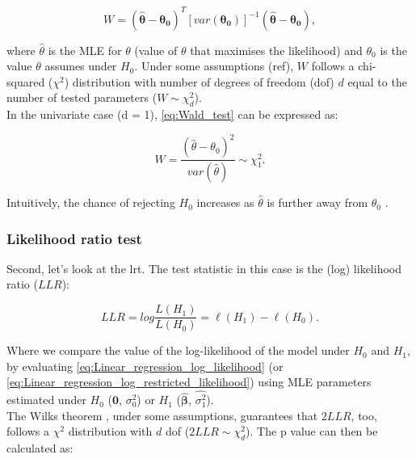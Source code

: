 \begin{equation}\label{eq:Wald_test}
W = (\hat{\boldsymbol{\theta}}-\boldsymbol{\theta_0})^T [var(\boldsymbol{\theta_0})]^{-1}(\hat{\boldsymbol{\theta}}-\boldsymbol{\theta_0}), 
\end{equation}

where $\hat{\theta}$ is the MLE for $\theta$ (value of $\theta$ that maximises the likelihood) and $\theta_0$ is the value $\theta$ assumes under $H_0$.
Under some assumptions (ref), $W$ follows a chi-squared ($\chi^2$) distribution with number of degrees of freedom (dof) $d$ equal to the number of tested parameters ($W \sim \chi^2_d $).\\

In the univariate case (d = 1), \eqref{eq:Wald_test} can be expressed as:

\begin{equation}\label{eq:Wald_test_univariate}
    W = \frac{(\hat{\theta}-\theta_0)^2}{var(\hat{\theta})} \sim \chi^2_1.
\end{equation}

Intuitively, the chance of rejecting $H_0$ increases as $\hat{\theta}$ is further away from $\theta_0$
.


\subsubsection{Likelihood ratio test}

Second, let's look at the \gls{lrt}.
The test statistic in this case is the (log) likelihood ratio ($LLR$):

\begin{equation}\label{eq:log_likelihood_ratio}
LLR = log \frac{L(H_1)}{L(H_0)} = \ell(H_1) - \ell(H_0). 
\end{equation}

Where we compare the value of the log-likelihood of the model under $H_0$ and $H_1$, by evaluating \eqref{eq:Linear_regression_log_likelihood} (or \eqref{eq:Linear_regression_log_restricted_likelihood}) using MLE parameters estimated under $H_0$ ($\mathbf{0}$, $\sigma_0^2$) or $H_1$ ($\hat{\boldsymbol{\beta}}$, $\hat{\sigma_1^2}$).  \\

The Wilks theorem \cite{wilks1938large}, under some assumptions, guarantees that $2LLR$, too, follows a $\chi^2$ distribution with $d$ dof ($2LLR \sim \chi^2_d$).
The p value can then be calculated as:


